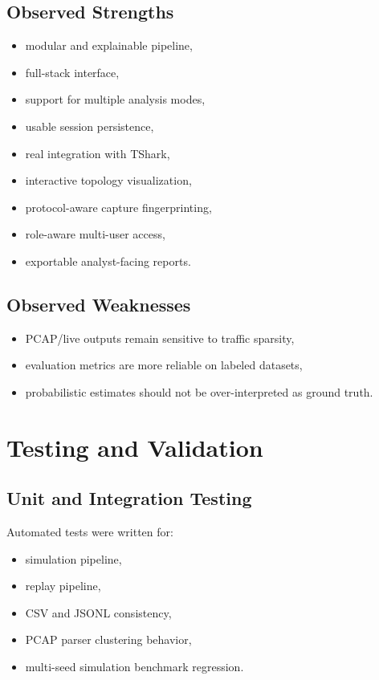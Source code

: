 \documentclass[12pt,a4paper]{report}
\begin{document}
\section{Observed Strengths}
\begin{itemize}[leftmargin=1.5em]
    \item modular and explainable pipeline,
    \item full-stack interface,
    \item support for multiple analysis modes,
    \item usable session persistence,
    \item real integration with TShark,
    \item interactive topology visualization,
    \item protocol-aware capture fingerprinting,
    \item role-aware multi-user access,
    \item exportable analyst-facing reports.
\end{itemize}

\section{Observed Weaknesses}
\begin{itemize}[leftmargin=1.5em]
    \item PCAP/live outputs remain sensitive to traffic sparsity,
    \item evaluation metrics are more reliable on labeled datasets,
    \item probabilistic estimates should not be over-interpreted as ground truth.
\end{itemize}

\chapter{Testing and Validation}
\section{Unit and Integration Testing}
Automated tests were written for:
\begin{itemize}[leftmargin=1.5em]
    \item simulation pipeline,
    \item replay pipeline,
    \item CSV and JSONL consistency,
    \item PCAP parser clustering behavior,
    \item multi-seed simulation benchmark regression.
\end{itemize}
\end{document}
